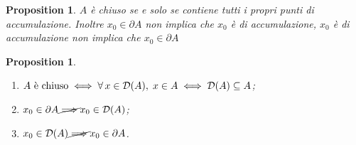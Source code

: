 \documentclass{article}
\theoremstyle{plain}
\newtheorem{prop}[thm]{Proposition}
\theoremstyle{definition}
\theoremstyle{remark}
\begin{document}
\vspace{10pt}

\begin{bxthm}
\begin{prop}
    $A$ è chiuso se e solo se contiene tutti i propri punti di accumulazione. 
    Inoltre $x_0\in\partial A$ non implica che $x_0$ è di accumulazione, $x_0$ è di accumulazione non implica che $x_0\in \partial A$
\end{prop}
\end{bxthm}

\vspace{10pt}

\begin{bxthm}
\begin{prop}\hfill
    \begin{enumerate}
        \item $A\textup{ è chiuso}\iff\forall\,x\in\mathcal{D}(A),\;x\in A\iff\mathcal{D}(A)\subseteq A$;
        \item $x_0\in\partial A\cancel{\implies}x_0\in\mathcal{D}(A)$;
        \item $x_0\in\mathcal{D}(A)\cancel{\implies}x_0\in\partial A$.
    \end{enumerate}
\end{prop}
\end{bxthm}

\vspace{10pt}
\end{document}
